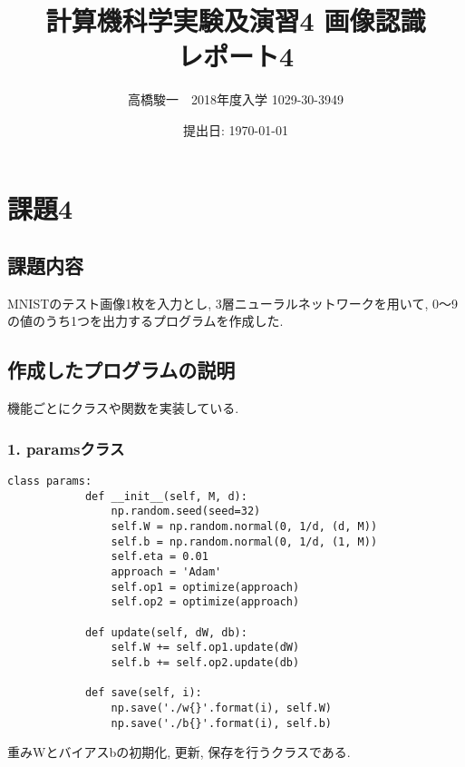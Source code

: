 \documentclass[a4j, titlepage]{jarticle}
\begin{document}
\title{計算機科学実験及演習4 画像認識　\\ \bf レポート4}
\author{高橋駿一　2018年度入学 1029-30-3949}
\date{提出日: \today} %
\maketitle

\clearpage

\section*{課題4}
\subsection*{課題内容}
MNISTのテスト画像1枚を入力とし, 3層ニューラルネットワークを用いて, 0～9の値のうち1つを出力するプログラムを作成した.

\subsection*{作成したプログラムの説明}
機能ごとにクラスや関数を実装している.
    \subsubsection*{1. paramsクラス}
        \begin{lstlisting}[caption=パラメータWとbに関する処理 ,label=fuga]
        class params:
            def __init__(self, M, d):
                np.random.seed(seed=32)
                self.W = np.random.normal(0, 1/d, (d, M))
                self.b = np.random.normal(0, 1/d, (1, M))
                self.eta = 0.01
                approach = 'Adam'
                self.op1 = optimize(approach)
                self.op2 = optimize(approach)

            def update(self, dW, db):
                self.W += self.op1.update(dW)
                self.b += self.op2.update(db)

            def save(self, i):
                np.save('./w{}'.format(i), self.W)
                np.save('./b{}'.format(i), self.b)
        \end{lstlisting}
        重みWとバイアスbの初期化, 更新, 保存を行うクラスである.
\end{document}
